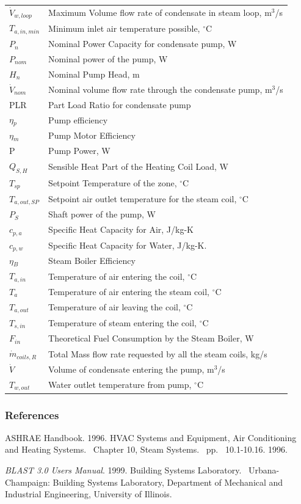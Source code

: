 \begin{longtable}[c]{p{1.0in}p{4.0in}}
\(\dot V_{w,loop}\) & Maximum Volume flow rate of condensate in steam loop, m\(^3\)/s \tabularnewline
\(T_{a,in,min}\) & Minimum inlet air temperature possible, \(^{\circ}\)C \tabularnewline
\(P_{n}\) & Nominal Power Capacity for condensate pump, W \tabularnewline
\(P_{nom}\) & Nominal power of the pump, W \tabularnewline
\(H_{n}\) & Nominal Pump Head, m \tabularnewline
\(\dot V_{nom}\) & Nominal volume flow rate through the condensate pump, m\(^3\)/s \tabularnewline
PLR & Part Load Ratio for condensate pump \tabularnewline
\(\eta\)\(_{p}\) & Pump efficiency \tabularnewline
\(\eta\)\(_{m}\) & Pump Motor Efficiency \tabularnewline
P & Pump Power, W \tabularnewline
\(Q_{S,H}\) & Sensible Heat Part of the Heating Coil Load, W \tabularnewline
\(T_{sp}\) & Setpoint Temperature of the zone, \(^{\circ}\)C \tabularnewline
\(T_{a,out,SP}\) & Setpoint air outlet temperature for the steam coil, \(^{\circ}\)C \tabularnewline
\(P_{S}\) & Shaft power of the pump, W \tabularnewline
\(c_{p,a}\) & Specific Heat Capacity for Air, J/kg-K \tabularnewline
\(c_{p,w}\) & Specific Heat Capacity for Water, J/kg-K. \tabularnewline
\(\eta\)\(_{B}\) & Steam Boiler Efficiency \tabularnewline
\(T_{a,in}\) & Temperature of air entering the coil, \(^{\circ}\)C \tabularnewline
\(T_{a}\) & Temperature of air entering the steam coil, \(^{\circ}\)C \tabularnewline
\(T_{a,out}\) & Temperature of air leaving the coil, \(^{\circ}\)C \tabularnewline
\(T_{s,in}\) & Temperature of steam entering the coil, \(^{\circ}\)C \tabularnewline
\(F_{in}\) & Theoretical Fuel Consumption by the Steam Boiler, W \tabularnewline
\(\dot m_{coils,R}\) & Total Mass flow rate requested by all the steam coils, kg/s \tabularnewline
\(\dot V\) & Volume of condensate entering the pump, m\(^3\)/s \tabularnewline
\(T_{w,out}\) & Water outlet temperature from pump, \(^{\circ}\)C \tabularnewline
\bottomrule
\end{longtable}

\subsubsection{References}\label{references-007}

ASHRAE Handbook. 1996. HVAC Systems and Equipment, Air Conditioning and Heating Systems.~ Chapter 10, Steam Systems.~ pp.\emph{~} 10.1-10.16. 1996.

\emph{BLAST 3.0 Users Manual}. 1999. Building Systems Laboratory.~ Urbana-Champaign: Building Systems Laboratory, Department of Mechanical and Industrial Engineering, University of Illinois.

